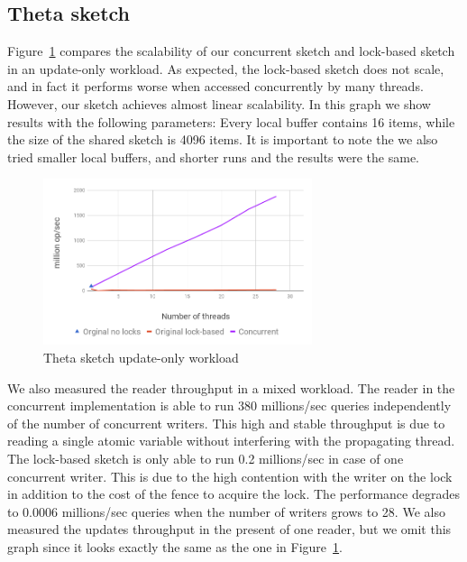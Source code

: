 \subsection{Theta sketch}
\label{sub:thetaExp}

Figure~\ref{fig:ConccurentTheta} compares the scalability
of our concurrent sketch and lock-based sketch in an update-only workload.
As expected, the lock-based sketch does not scale, and
in fact it performs worse when accessed concurrently by many
threads.
However, our sketch achieves almost linear scalability.
In this graph we show results with the following parameters:
Every local buffer contains 16 items, while the size of the
shared sketch is 4096 items.
It is important to note the we also tried smaller local buffers,
and shorter runs and the results were the same.

\begin{figure}[h]
  \centering
  \includegraphics*[width=3.1in]{images/concurrentThetaGraph}
  \caption{Theta sketch update-only workload}
   \label{fig:ConccurentTheta}
\end{figure}




We also measured the reader
throughput  in a mixed workload.
The reader in the concurrent implementation is able to run 380
millions/sec queries independently of the number of concurrent
writers. This high and stable throughput is due to reading a single atomic variable without interfering with the propagating thread.
The lock-based sketch is only able to run 0.2 millions/sec in case of one concurrent writer. This is due to the high contention with the writer on the lock in addition to the cost of the fence to acquire the lock.
The performance degrades to 0.0006 millions/sec queries when the
number of writers grows to 28.
We also measured the updates throughput in the present of one
reader, but we omit this graph since it looks exactly the same as
the one in Figure~\ref{fig:ConccurentTheta}.

